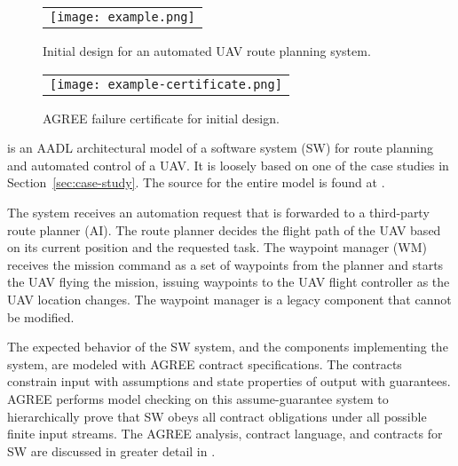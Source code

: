 \begin{figure*}[h]
  \begin{center}
    \begin{tabular}{c}
      \texttt{[image: example.png]}
    \end{tabular}
  \end{center}
\caption{Initial design for an automated UAV route planning system.}
\label{fig:example}
\end{figure*}

\begin{figure}
  \begin{center}
    \begin{tabular}{c}
      \texttt{[image: example-certificate.png]} \\
    \end{tabular}
  \end{center}
\caption{AGREE failure certificate for initial design.}
\label{fig:example-certificate}
\end{figure}

 is an AADL architectural model of a software
system (SW) for route planning and automated control of a UAV.  It is
loosely based on one of the case studies in
Section~\ref{sec:case-study}.  The source for the entire model is
found at \cite{repo}.

The system receives an automation request that is forwarded to a
third-party route planner (AI).  The route planner decides the flight
path of the UAV based on its current position and the requested task.
The waypoint manager (WM) receives the mission command as a set of
waypoints from the planner and starts the UAV flying the mission,
issuing waypoints to the UAV flight controller as the UAV location
changes.  The waypoint manager is a legacy component that cannot be
modified.

The expected behavior of the SW system, and the components
implementing the system, are modeled with AGREE contract
specifications.  The contracts constrain input with assumptions and
state properties of output with guarantees.  AGREE performs model
checking on this assume-guarantee system to hierarchically prove that
SW obeys all contract obligations under all possible finite input
streams.  The AGREE analysis, contract language, and contracts for SW
are discussed in greater detail in .

